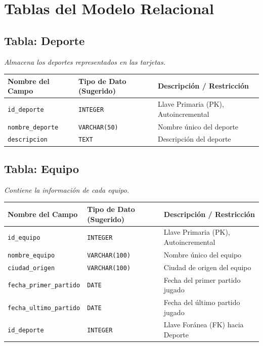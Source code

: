 \documentclass{article}
\begin{document}
\section*{Tablas del Modelo Relacional}

\subsection*{Tabla: Deporte}
\textit{Almacena los deportes representados en las tarjetas.}
\begin{center}
\begin{tabular}{|l|l|p{6cm}|}
\hline
\textbf{Nombre del Campo} & \textbf{Tipo de Dato (Sugerido)} & \textbf{Descripción / Restricción} \\
\hline
\texttt{id\_deporte} & \texttt{INTEGER} & Llave Primaria (PK), Autoincremental \\
\texttt{nombre\_deporte} & \texttt{VARCHAR(50)} & Nombre único del deporte \\
\texttt{descripcion} & \texttt{TEXT} & Descripción del deporte \\
\hline
\end{tabular}
\end{center}

\subsection*{Tabla: Equipo}
\textit{Contiene la información de cada equipo.}
\begin{center}
\begin{tabular}{|l|l|p{6cm}|}
\hline
\textbf{Nombre del Campo} & \textbf{Tipo de Dato (Sugerido)} & \textbf{Descripción / Restricción} \\
\hline
\texttt{id\_equipo} & \texttt{INTEGER} & Llave Primaria (PK), Autoincremental \\

\texttt{nombre\_equipo} & \texttt{VARCHAR(100)} & Nombre único del equipo \\
\texttt{ciudad\_origen} & \texttt{VARCHAR(100)} & Ciudad de origen del equipo \\
\texttt{fecha\_primer\_partido} & \texttt{DATE} & Fecha del primer partido jugado \\
\texttt{fecha\_ultimo\_partido} & \texttt{DATE} & Fecha del último partido jugado \\
\texttt{id\_deporte} & \texttt{INTEGER} & Llave Foránea (FK) hacia Deporte \\
\hline
\end{tabular}
\end{center}
\end{document}
